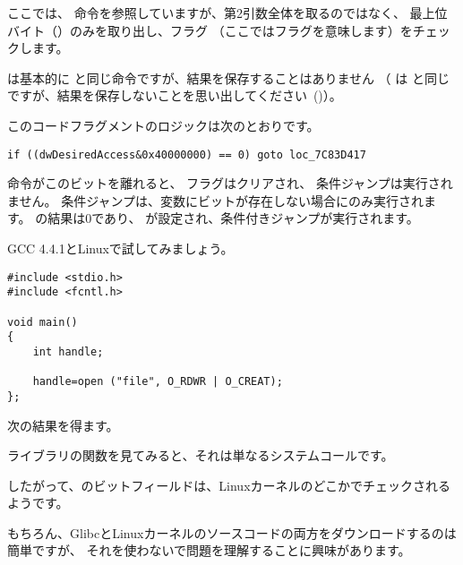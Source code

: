 
ここでは、 \TEST 命令を参照していますが、第2引数全体を取るのではなく、
最上位バイト（）のみを取り出し、フラグ
（ここではフラグを意味します）をチェックします。

\TEST は基本的に \AND と同じ命令ですが、結果を保存することはありません
（ \CMP は \SUB と同じですが、結果を保存しないことを思い出してください~()）。

このコードフラグメントのロジックは次のとおりです。

\begin{lstlisting}[style=customc]
if ((dwDesiredAccess&0x40000000) == 0) goto loc_7C83D417
\end{lstlisting}


\AND 命令がこのビットを離れると、 \ZF フラグはクリアされ、
\JZ 条件ジャンプは実行されません。 
条件ジャンプは、変数にビットが存在しない場合にのみ実行されます。 
\AND の結果は0であり、 \ZF が設定され、条件付きジャンプが実行されます。

GCC 4.4.1とLinuxで試してみましょう。

\begin{lstlisting}[style=customc]
#include <stdio.h>
#include <fcntl.h>

void main()
{
	int handle;

	handle=open ("file", O_RDWR | O_CREAT);
};
\end{lstlisting}

次の結果を得ます。




ライブラリの関数を見てみると、それは単なるシステムコールです。



したがって、のビットフィールドは、Linuxカーネルのどこかでチェックされるようです。

もちろん、GlibcとLinuxカーネルのソースコードの両方をダウンロードするのは簡単ですが、
それを使わないで問題を理解することに興味があります。

